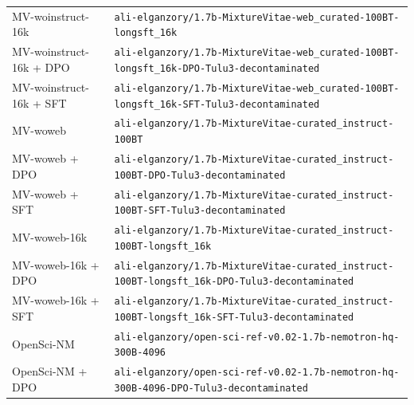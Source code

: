 \begin{table}[ht]
\begin{tabular}{lp{10cm}}
MV-woinstruct-16k & \texttt{ali-\allowbreak{}elganzory/\allowbreak{}1.7b-\allowbreak{}MixtureVitae-\allowbreak{}web\_curated-\allowbreak{}100BT-\allowbreak{}longsft\_16k} \\
MV-woinstruct-16k + DPO & \texttt{ali-\allowbreak{}elganzory/\allowbreak{}1.7b-\allowbreak{}MixtureVitae-\allowbreak{}web\_curated-\allowbreak{}100BT-\allowbreak{}longsft\_16k-\allowbreak{}DPO-\allowbreak{}Tulu3-\allowbreak{}decontaminated} \\
MV-woinstruct-16k + SFT & \texttt{ali-\allowbreak{}elganzory/\allowbreak{}1.7b-\allowbreak{}MixtureVitae-\allowbreak{}web\_curated-\allowbreak{}100BT-\allowbreak{}longsft\_16k-\allowbreak{}SFT-\allowbreak{}Tulu3-\allowbreak{}decontaminated} \\
MV-woweb & \texttt{ali-\allowbreak{}elganzory/\allowbreak{}1.7b-\allowbreak{}MixtureVitae-\allowbreak{}curated\_instruct-\allowbreak{}100BT} \\
MV-woweb + DPO & \texttt{ali-\allowbreak{}elganzory/\allowbreak{}1.7b-\allowbreak{}MixtureVitae-\allowbreak{}curated\_instruct-\allowbreak{}100BT-\allowbreak{}DPO-\allowbreak{}Tulu3-\allowbreak{}decontaminated} \\
MV-woweb + SFT & \texttt{ali-\allowbreak{}elganzory/\allowbreak{}1.7b-\allowbreak{}MixtureVitae-\allowbreak{}curated\_instruct-\allowbreak{}100BT-\allowbreak{}SFT-\allowbreak{}Tulu3-\allowbreak{}decontaminated} \\
MV-woweb-16k & \texttt{ali-\allowbreak{}elganzory/\allowbreak{}1.7b-\allowbreak{}MixtureVitae-\allowbreak{}curated\_instruct-\allowbreak{}100BT-\allowbreak{}longsft\_16k} \\
MV-woweb-16k + DPO & \texttt{ali-\allowbreak{}elganzory/\allowbreak{}1.7b-\allowbreak{}MixtureVitae-\allowbreak{}curated\_instruct-\allowbreak{}100BT-\allowbreak{}longsft\_16k-\allowbreak{}DPO-\allowbreak{}Tulu3-\allowbreak{}decontaminated} \\
MV-woweb-16k + SFT & \texttt{ali-\allowbreak{}elganzory/\allowbreak{}1.7b-\allowbreak{}MixtureVitae-\allowbreak{}curated\_instruct-\allowbreak{}100BT-\allowbreak{}longsft\_16k-\allowbreak{}SFT-\allowbreak{}Tulu3-\allowbreak{}decontaminated} \\
OpenSci-NM & \texttt{ali-\allowbreak{}elganzory/\allowbreak{}open-\allowbreak{}sci-\allowbreak{}ref-\allowbreak{}v0.02-\allowbreak{}1.7b-\allowbreak{}nemotron-\allowbreak{}hq-\allowbreak{}300B-\allowbreak{}4096} \\
OpenSci-NM + DPO & \texttt{ali-\allowbreak{}elganzory/\allowbreak{}open-\allowbreak{}sci-\allowbreak{}ref-\allowbreak{}v0.02-\allowbreak{}1.7b-\allowbreak{}nemotron-\allowbreak{}hq-\allowbreak{}300B-\allowbreak{}4096-\allowbreak{}DPO-\allowbreak{}Tulu3-\allowbreak{}decontaminated} \\

\end{tabular}
\end{table}
